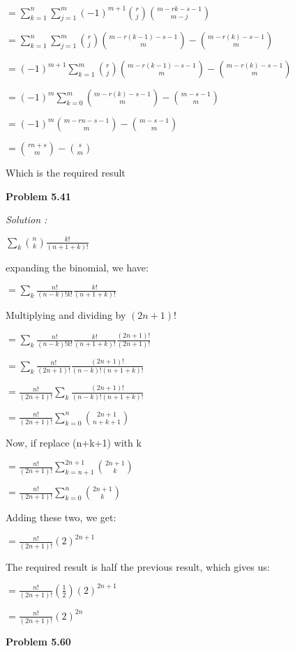 \documentclass[12pt]{article}
\begin{document}
$= \sum_{k=1}^{n}\sum_{j=1}^{m} {(-1)^{m+1}}{\binom{r}{j}}{\binom{m-rk-s-1}{m-j}}$

$= \sum_{k=1}^{n}\sum_{j=1}^{m}{{\binom{r}{j}}{\binom{m-r(k-1)-s-1}{m}}}-{\binom{m-r(k)-s-1}{m}}$


$= (-1)^{m+1}\sum_{k=1}^{m}{{\binom{r}{j}}{\binom{m-r(k-1)-s-1}{m}}}-{\binom{m-r(k)-s-1}{m}}$

$= (-1)^{m}\sum_{k=0}^{m}{{\binom{m-r(k)-s-1}{m}}}-{\binom{m-s-1}{m}}$

$= (-1)^{m}{{\binom{m-rn-s-1}{m}}}-{\binom{m-s-1}{m}}$

$= {\binom{rn+s}{m}}-{\binom{s}{m}}$

Which is the required result

\medskip

\medskip

\noindent
{\bf Problem 5.41}

\textit {Solution :}

$\sum_{k}{\binom{n}{k}}{\frac{k!}{(n+1+k)!}}$

expanding the binomial, we have:

$= \sum_{k}{\frac{n!}{(n-k)!k!}}{\frac{k!}{(n+1+k)!}}$

Multiplying and dividing by $(2n+1)!$

$= \sum_{k}{\frac{n!}{(n-k)!k!}}{\frac{k!}{(n+1+k)!}}{\frac{(2n+1)!}{(2n+1)!}}$

$= \sum_{k}{\frac{n!}{(2n+1)!}}{\frac{(2n+1)!}{(n-k)!(n+1+k)!}}$

$= {\frac{n!}{(2n+1)!}}\sum_{k}{\frac{(2n+1)!}{(n-k)!(n+1+k)!}}$

$= {\frac{n!}{(2n+1)!}}\sum_{k=0}^{n}{\binom{2n+1}{n+k+1}}$

Now, if replace (n+k+1) with k

$= {\frac{n!}{(2n+1)!}}\sum_{k=n+1}^{2n+1}{\binom{2n+1}{k}}$

$= {\frac{n!}{(2n+1)!}}\sum_{k=0}^{n}{\binom{2n+1}{k}}$

Adding these two, we get:

$= {\frac{n!}{(2n+1)!}}{(2)^{2n+1}}$

The required result is half the previous result, which gives us:

$= {\frac{n!}{(2n+1)!}}{(\frac{1}{2})(2)^{2n+1}}$

$= {\frac{n!}{(2n+1)!}}{(2)^{2n}}$

\medskip

\medskip

\noindent
{\bf Problem 5.60}
\end{document}
